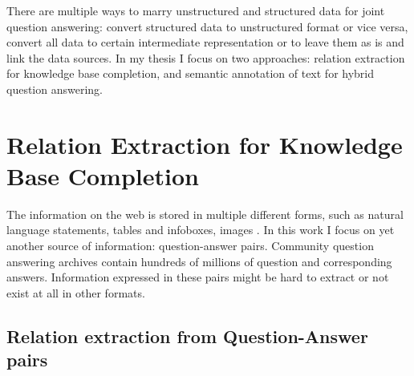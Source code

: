 %

\label{chapter:factoid}

\noindent

There are multiple ways to marry unstructured and structured data for joint question answering: convert structured data to unstructured format or vice versa, convert all data to certain intermediate representation or to leave them as is and link the data sources.
In my thesis I focus on two approaches: relation extraction for knowledge base completion, and semantic annotation of text for hybrid question answering.


\section{Relation Extraction for Knowledge Base Completion}
\label{sec:relation_extraction}

The information on the web is stored in multiple different forms, such as natural language statements, tables and infoboxes, images \etc.
In this work I focus on yet another source of information: question-answer pairs.
Community question answering archives contain hundreds of millions of question and corresponding answers.
Information expressed in these pairs might be hard to extract or not exist at all in other formats.

\subsection{Relation extraction from Question-Answer pairs}
\label{subsec:cqa_relextract}


